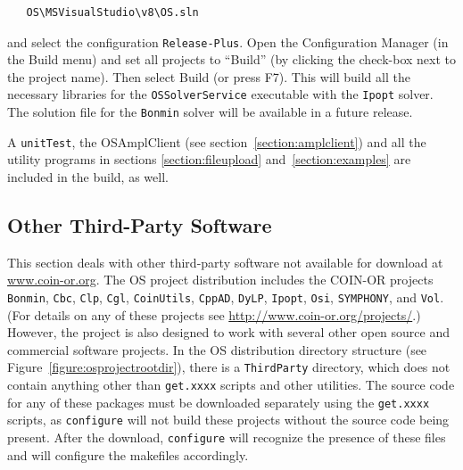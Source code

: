 \documentclass[11pt]{article}
\newcounter{Fig}
\renewcommand{\_}{{\char"5F}}
\renewcommand{\{}{{\char"7B}}
\renewcommand{\}}{{\char"7D}}
\renewcommand{\^}{{\char"0D}}
\renewcommand{\'}{{\char"0D}}
\begin{document}
\begin{enumerate}
\begin{verbatim}
   OS\MSVisualStudio\v8\OS.sln
\end{verbatim}

and select the configuration {\tt Release-Plus}. 
Open the Configuration Manager (in the Build menu)
and set all projects to ``Build''
(by clicking the check-box next to the project name).
Then select Build (or press F7).
This will build all the necessary libraries for the
{\tt OSSolverService} executable
with the {\tt Ipopt} solver. The solution file for the {\tt Bonmin} solver will be
available in a future release.

A {\tt unitTest},
the OSAmplClient (see section~\ref{section:amplclient})
and all the utility programs in sections \ref{section:fileupload}
and~\ref{section:examples} are included in the build, as well.
\end{enumerate}


\fi


\subsection{Other Third-Party Software} \label{section:otherthirdparty}

%
This section deals with other third-party software not available for download at \url{www.coin-or.org}. 
The OS project distribution includes the COIN-OR projects  {\tt Bonmin}, 
{\tt Cbc}, {\tt Clp}, {\tt Cgl}, 
{\tt CoinUtils}, {\tt CppAD},   
{\tt DyLP},   {\tt Ipopt},  
{\tt Osi}, {\tt SYMPHONY}, and {\tt Vol}.  
(For details on any of these projects see \url{http://www.coin-or.org/projects/}.)
However, the project is also designed to work with  several other open source and commercial software projects.
In the OS distribution directory structure (see Figure~\ref{figure:osprojectrootdir}), there is a {\tt ThirdParty} 
directory, which does not contain anything other than {\tt get.xxxx} scripts and other utilities.  
The source code for any of these packages must be downloaded separately using the {\tt get.xxxx} scripts, 
as {\tt configure} will not build these projects without the source code being present. After the download, 
{\tt configure} will recognize the presence of these files and will configure the makefiles accordingly. 
\end{document}
